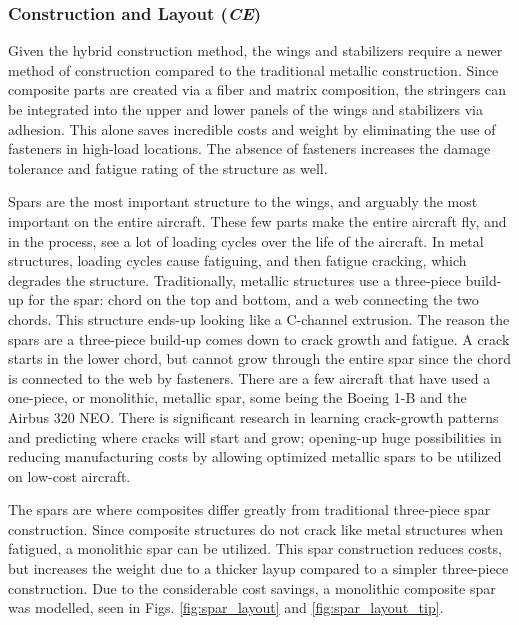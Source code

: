 \subsubsection{Construction and Layout (\textit{CE})}
Given the hybrid construction method, the wings and stabilizers require a newer method of construction compared to the traditional metallic construction. Since composite parts are created via a fiber and matrix composition, the stringers can be integrated into the upper and lower panels of the wings and stabilizers via adhesion. This alone saves incredible costs and weight by eliminating the use of fasteners in high-load locations. The absence of fasteners increases the damage tolerance and fatigue rating of the structure as well.

Spars are the most important structure to the wings, and arguably the most important on the entire aircraft. These few parts make the entire aircraft fly, and in the process, see a lot of loading cycles over the life of the aircraft. In metal structures, loading cycles cause fatiguing, and then fatigue cracking, which degrades the structure. Traditionally, metallic structures use a three-piece build-up for the spar: chord on the top and bottom, and a web connecting the two chords. This structure ends-up looking like a C-channel extrusion. The reason the spars are a three-piece build-up comes down to crack growth and fatigue. A crack starts in the lower chord, but cannot grow through the entire spar since the chord is connected to the web by fasteners. There are a few aircraft that have used a one-piece, or monolithic, metallic spar, some being the Boeing 1-B and the Airbus 320 NEO. There is significant research in learning crack-growth patterns and predicting where cracks will start and grow; opening-up huge possibilities in reducing manufacturing costs by allowing optimized metallic spars to be utilized on low-cost aircraft.

The spars are where composites differ greatly from traditional three-piece spar construction. Since composite structures do not crack like metal structures when fatigued, a monolithic spar can be utilized. This spar construction reduces costs, but increases the weight due to a thicker layup compared to a simpler three-piece construction. Due to the considerable cost savings, a monolithic composite spar was modelled, seen in Figs. \ref{fig:spar_layout} and \ref{fig:spar_layout_tip}.

